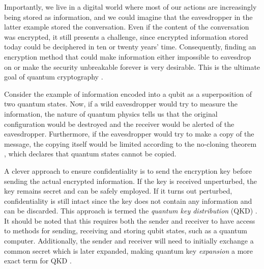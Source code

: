 Importantly, we live in a digital world where most of our actions are increasingly being stored as information, and we could imagine that the eavesdropper in the latter example stored the conversation. Even if the content of the conversation was encrypted, it still presents a challenge, since encrypted information stored today could be deciphered in ten or twenty years' time.
Consequently, finding an encryption method that could make information either impossible to eavesdrop on or make the security unbreakable forever is very desirable. This is the ultimate goal of quantum cryptography \cite{Pavicic2006}.

Consider the example of information encoded into a qubit as a superposition of two quantum states. Now, if a wild eavesdropper would try to measure the information, the nature of quantum physics tells us that the original configuration would be destroyed and the receiver would be alerted of the eavesdropper. Furthermore, if the eavesdropper would try to make a copy of the message, the copying itself would be limited according to the no-cloning theorem \cite{Gisin2002}, which declares that quantum states cannot be copied.

A clever approach to ensure confidentiality is to send the encryption key before sending the actual encrypted information. If the key is received unperturbed, the key remains secret and can be safely employed. If it turns out perturbed, confidentiality is still intact since the key does not contain any information and can be discarded. This approach is termed the \textit{quantum key distribution} (QKD) \cite{Gisin2002, Gisin2007}. It should be noted that this requires both the sender and receiver to have access to methods for sending, receiving and storing qubit states, such as a quantum computer. Additionally, the sender and receiver will need to initially exchange a common secret which is later expanded, making quantum key \textit{expansion} a more exact term for QKD \cite{Pavicic2006, Gisin2007}.

